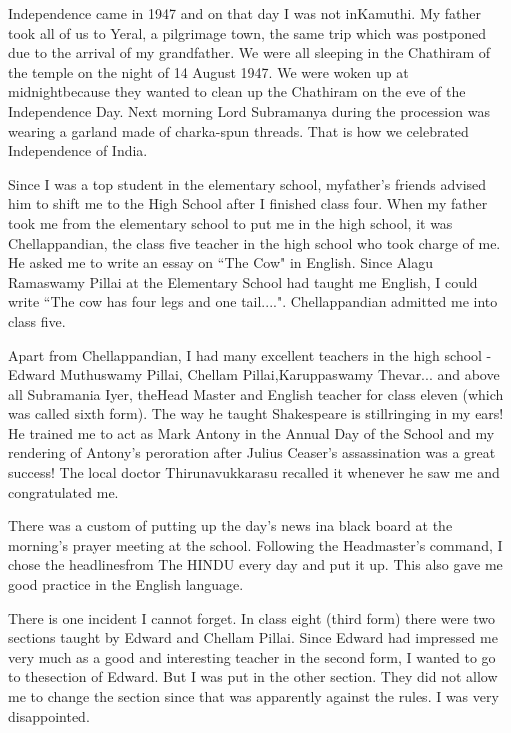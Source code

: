 Independence came in 1947 and on that day I was not in\break Kamuthi. My 
father took all of us to Yeral, a pilgrimage town, the same trip which 
was postponed due to the arrival of my grandfather. We were all sleeping 
in the Chathiram of the temple on the night of 14 August 1947. We were 
woken up at midnight\break because they wanted to clean up the Chathiram on 
the eve of the Independence Day. Next morning Lord Subramanya during the 
procession was wearing a garland made of charka-spun threads. That is 
how we celebrated Independence of India.

Since I was a top student in the elementary school, my\break father's friends 
advised him to shift me to the High School after I finished class four. 
When my father took me from the elementary school to put me in the high 
school, it was Chellappandian, the class five teacher in the high school 
who took charge of me. He asked me to write an essay on ``The Cow" in 
English. Since Alagu Ramaswamy Pillai at the Elementary School had 
taught me English, I could write ``The cow has four legs and one 
tail....". Chellappandian admitted me into class five.

Apart from Chellappandian, I had many excellent teachers in the high 
school - Edward Muthuswamy Pillai, Chellam Pillai,\break Karuppaswamy 
Thevar... and above all Subramania Iyer, the\break Head Master and English 
teacher for class eleven (which was called sixth form). The way he 
taught Shakespeare is still\break ringing in my ears! He trained me to act as 
Mark Antony in the Annual Day of the School and my rendering of Antony's 
peroration after Julius Ceaser's assassination was a great success! The 
local doctor Thirunavukkarasu recalled it whenever he saw me and 
congratulated me.

There was a custom of putting up the day's news in\break a black board at the 
morning's prayer meeting at the school. Follo\-wing the Headmaster's 
command, I chose the headlines\break from The HINDU every day and put it up. 
This also gave me good practice in the English language.

There is one incident I cannot forget. In class eight (third form) there 
were two sections taught by Edward and Chellam Pillai. Since Edward had 
impressed me very much as a good and interesting teacher in the second 
form, I wanted to go to the\break section of Edward. But I was put in the 
other section. They did not allow me to change the section since that 
was apparently against the rules. I was very disappointed.

